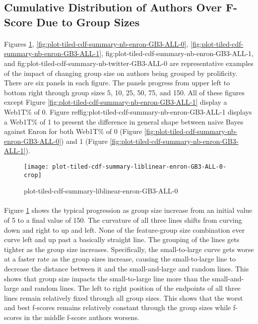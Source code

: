 \subsection{Cumulative Distribution of Authors Over F-Score Due to Group Sizes}
\paragraph*{} Figures \ref{fig:plot-tiled-cdf-summary-liblinear-enron-GB3-ALL-0}, \ref{fig:plot-tiled-cdf-summary-nb-enron-GB3-ALL-0}, \ref{fig:plot-tiled-cdf-summary-nb-enron-GB3-ALL-1}, {fig:plot-tiled-cdf-summary-nb-enron-GB3-ALL-1}, and {fig:plot-tiled-cdf-summary-nb-twitter-GB3-ALL-0} are representative examples of the impact of changing group size on authors being grouped by prolificity.  There are six panels in each figure.  The panels progress from upper left to bottom right through group sizes 5, 10, 25, 50, 75, and 150.  All of these figures except Figure \ref{fig:plot-tiled-cdf-summary-nb-enron-GB3-ALL-1} display a Web1T\% of 0. Figure ref{fig:plot-tiled-cdf-summary-nb-enron-GB3-ALL-1} displays a Web1T\% of 1 to present the difference in general shape between naive Bayes against Enron for both Web1T\% of 0 (Figure \ref{fig:plot-tiled-cdf-summary-nb-enron-GB3-ALL-0}) and 1 (Figure \ref{fig:plot-tiled-cdf-summary-nb-enron-GB3-ALL-1}).

	\begin{figure}[htbp!]
		\begin{center}
		\centering
		\texttt{[image: plot-tiled-cdf-summary-liblinear-enron-GB3-ALL-0-crop]}
		\caption{plot-tiled-cdf-summary-liblinear-enron-GB3-ALL-0}
		\label{fig:plot-tiled-cdf-summary-liblinear-enron-GB3-ALL-0}
		\end{center}
	\end{figure}

\paragraph*{} Figure \ref{fig:plot-tiled-cdf-summary-liblinear-enron-GB3-ALL-0} shows the typical progression as group size increase from an initial value of 5 to a final value of 150.  The curvature of all three lines shifts from curving down and right to up and left.  None of the feature-group size combination ever curve left and up past a basically straight line.  The grouping of the lines gets tighter as the group size increases.  Specifically, the small-to-large curve gets worse at a faster rate as the group sizes increase, causing the small-to-large line to decrease the distance between it and the small-and-large and random lines.  This shows that group size impacts the small-to-large line more than the small-and-large and random lines.  The left to right position of the endpoints of all three lines remain relatively fixed through all group sizes.  This shows that the worst and best f-scores remains relatively constant through the group sizes while f-scores in the middle f-score authors worsens.
	
